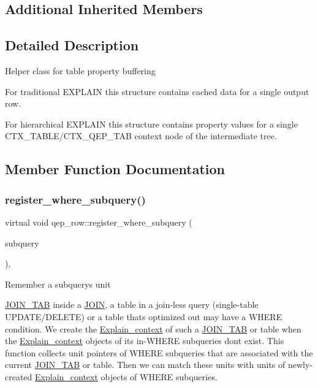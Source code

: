 \subsection*{Additional Inherited Members}


\subsection{Detailed Description}
Helper class for table property buffering

For traditional E\+X\+P\+L\+A\+IN this structure contains cached data for a single output row.

For hierarchical E\+X\+P\+L\+A\+IN this structure contains property values for a single C\+T\+X\+\_\+\+T\+A\+B\+L\+E/\+C\+T\+X\+\_\+\+Q\+E\+P\+\_\+\+T\+AB context node of the intermediate tree. 

\subsection{Member Function Documentation}
\mbox{\label{classqep__row_ad5453e115753d93ac2abf2cabcb8ea03}} 
\subsubsection{\texorpdfstring{register\+\_\+where\+\_\+subquery()}{register\_where\_subquery()}}
{\footnotesize\ttfamily virtual void qep\+\_\+row\+::register\+\_\+where\+\_\+subquery (\begin{DoxyParamCaption}\item[{S\+E\+L\+E\+C\+T\+\_\+\+L\+E\+X\+\_\+\+U\+N\+IT $\ast$}]{subquery }\end{DoxyParamCaption})\hspace{0.3cm}{\ttfamily [inline]}, {\ttfamily [virtual]}}

Remember a subquery\textquotesingle{}s unit

\mbox{\hyperlink{classJOIN__TAB}{J\+O\+I\+N\+\_\+\+T\+AB}} inside a \mbox{\hyperlink{classJOIN}{J\+O\+IN}}, a table in a join-\/less query (single-\/table U\+P\+D\+A\+T\+E/\+D\+E\+L\+E\+TE) or a table that\textquotesingle{}s optimized out may have a W\+H\+E\+RE condition. We create the \mbox{\hyperlink{structExplain__context}{Explain\+\_\+context}} of such a \mbox{\hyperlink{classJOIN__TAB}{J\+O\+I\+N\+\_\+\+T\+AB}} or table when the \mbox{\hyperlink{structExplain__context}{Explain\+\_\+context}} objects of its in-\/W\+H\+E\+RE subqueries don\textquotesingle{}t exist. This function collects unit pointers of W\+H\+E\+RE subqueries that are associated with the current \mbox{\hyperlink{classJOIN__TAB}{J\+O\+I\+N\+\_\+\+T\+AB}} or table. Then we can match these units with units of newly-\/created \mbox{\hyperlink{structExplain__context}{Explain\+\_\+context}} objects of W\+H\+E\+RE subqueries.


